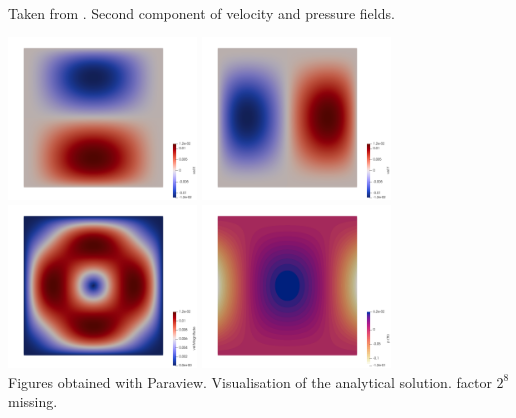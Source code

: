\begin{center}
\\
{\captionfont Taken from \cite{zhan09}. Second component of velocity and pressure fields.}
\end{center}

\begin{center}
\includegraphics[width=5cm]{python_codes/fieldstone_161/results/bench2/th_u}
\includegraphics[width=5cm]{python_codes/fieldstone_161/results/bench2/th_v}\\
\includegraphics[width=5cm]{python_codes/fieldstone_161/results/bench2/th_vel}
\includegraphics[width=5cm]{python_codes/fieldstone_161/results/bench2/th_press}\\
{\captionfont Figures obtained with Paraview. Visualisation of the analytical solution. 
factor $2^8$ missing.}
\end{center}

